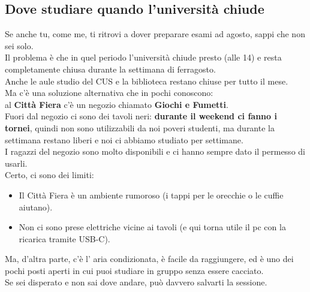 \documentclass[18pt]{extarticle}
\begin{document}
\subsection{Dove studiare quando l'università chiude}
Se anche tu, come me, ti ritrovi a dover preparare esami ad agosto, sappi che non sei solo.\\
Il problema è che in quel periodo l'università chiude presto (alle 14) e resta completamente chiusa durante la settimana di ferragosto.\\
Anche le aule studio del CUS e la biblioteca restano chiuse per tutto il mese.\\
Ma c'è una soluzione alternativa che in pochi conoscono:\\
al \textbf{Città Fiera} c'è un negozio chiamato \textbf{Giochi e Fumetti}.\\
Fuori dal negozio ci sono dei tavoli neri: \textbf{durante il weekend ci fanno i tornei}, quindi non sono utilizzabili da noi poveri studenti, ma durante la settimana restano liberi e noi ci abbiamo studiato per settimane.\\
I ragazzi del negozio sono molto disponibili e ci hanno sempre dato il permesso di usarli.\\
Certo, ci sono dei limiti:
\begin{itemize}
\item Il Città Fiera è un ambiente rumoroso (i tappi per le orecchie o le cuffie aiutano).
\item Non ci sono prese elettriche vicine ai tavoli (e qui torna utile il pc con la ricarica tramite USB-C).
\end{itemize}
Ma, d'altra parte, c'è l' aria condizionata, è facile da raggiungere, ed è uno dei pochi posti aperti in cui puoi studiare in gruppo senza essere cacciato.\\
Se sei disperato e non sai dove andare, può davvero salvarti la sessione.

\clearpage
\end{document}
